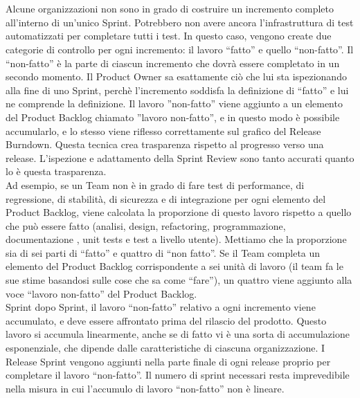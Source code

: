 \newpage
\section*{\color{Blue}{CONSIDERAZIONI FINALI}}
\label{sec:finalthoughts}
Alcune organizzazioni non sono in grado di costruire un incremento completo all'interno di un'unico Sprint. Potrebbero non avere ancora l'infrastruttura  di test automatizzati per completare tutti i test. In questo caso,  vengono create due categorie di controllo per ogni incremento: il lavoro ``fatto'' e quello ``non-fatto''. Il ``non-fatto'' \`e la parte di ciascun incremento che dovr\`a essere completato in un secondo momento. Il Product Owner sa esattamente ci\`o che lui sta ispezionando alla fine di uno Sprint, perch\`e l'incremento soddisfa la definizione di ``fatto'' e lui ne comprende la definizione. Il lavoro ''non-fatto'' viene aggiunto a un elemento del Product Backlog chiamato ''lavoro non-fatto'', e in questo modo \`e possibile accumularlo, e lo stesso viene riflesso correttamente sul grafico del Release Burndown. Questa tecnica crea trasparenza rispetto al progresso verso una release. L'ispezione e adattamento della Sprint Review sono tanto accurati quanto lo \`e questa trasparenza.\\

Ad esempio, se un Team non \`e in grado di fare test di performance, di regressione, di stabilit\`a, di sicurezza e di integrazione per ogni elemento del Product Backlog, viene calcolata la proporzione di questo lavoro rispetto a quello che pu\`o essere fatto (analisi, design, refactoring, programmazione, documentazione , unit tests e test a livello utente). Mettiamo che la proporzione sia di sei parti di ``fatto'' e quattro di ``non fatto''. Se il Team completa un elemento del Product Backlog corrispondente a sei unit\`a di lavoro (il team fa le sue stime basandosi sulle cose che sa  come ``fare''), un quattro viene aggiunto alla voce ``lavoro non-fatto'' del Product Backlog.\\

Sprint dopo Sprint, il lavoro ``non-fatto'' relativo a  ogni incremento viene accumulato, e deve essere affrontato prima del rilascio del prodotto. Questo lavoro si accumula linearmente, anche se di fatto vi \`e una sorta di accumulazione esponenziale, che dipende dalle caratteristiche di ciascuna organizzazione. I Release Sprint vengono aggiunti nella parte finale di ogni release proprio per completare il lavoro ``non-fatto''.
Il numero di sprint necessari resta imprevedibile nella misura in cui l'accumulo di lavoro ``non-fatto'' non \`e  lineare. 
